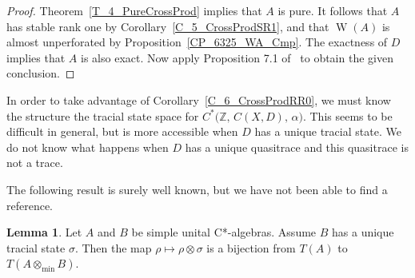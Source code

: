 \documentclass[10pt]{amsart}
\numberwithin{equation}{section}
\theoremstyle{definition}
\newtheorem{lem}[thm]{Lemma}
\newcommand{\af}{\alpha}
\newcommand{\sm}{\sigma}
\newcommand{\Z}{{\mathbb{Z}}}
\newcommand{\W}{{\operatorname{W}}}
\begin{document}
\begin{proof}
Theorem~\ref{T_4_PureCrossProd} implies that
$A$ is pure. It follows that $A$ has stable rank one by
Corollary~\ref{C_5_CrossProdSR1},
and that $\W (A)$ is almost unperforated
by Proposition~\ref{CP_6325_WA_Cmp}.
The exactness of $D$ implies that $A$ is also exact.
Now apply Proposition 7.1 of~\cite{Rord2004} to
obtain the given conclusion.
\end{proof}

In order to take advantage of
Corollary~\ref{C_6_CrossProdRR0}, we must know the
structure the tracial state space for
$C^* \bigl( \Z, \, C (X, D), \, \af \bigr)$.
This seems to be difficult in general, but is more
accessible when $D$ has a unique tracial state.
We do not know what happens when $D$ has a unique quasitrace
and this quasitrace is not a trace.

The following result is surely well known, but we have
not been able to find a reference.

\begin{lem}\label{L_1_TracesTensorProd}
Let $A$ and $B$ be simple unital C*-algebras.
Assume $B$ has a unique tracial state $\sm$.
Then the map $\rho \mapsto \rho \otimes \sm$
is a bijection from $T(A)$ to $T(A \otimes_{\min} B)$.
\end{lem}
\end{document}
